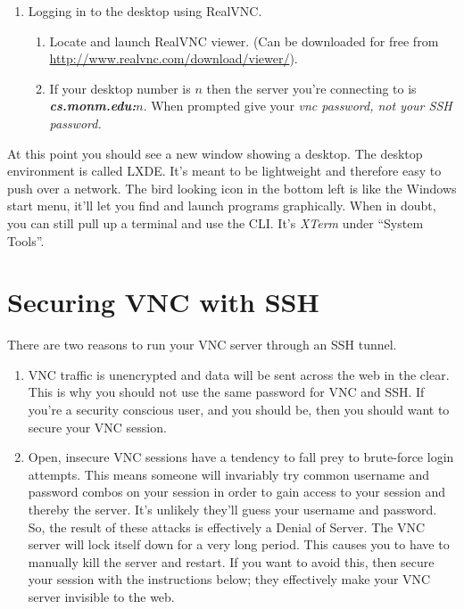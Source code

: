 \documentclass[10pt]{article}
\begin{document}
\begin{enumerate}
\item Logging in to the desktop using RealVNC.
\begin{enumerate}
\item Locate and launch RealVNC viewer. (Can be downloaded for free from \url{http://www.realvnc.com/download/viewer/}). 
\item If your desktop number is $n$ then the server you're connecting to is \textbf{\textit{cs.monm.edu:$n$}}. When prompted give your \textit{vnc password, not your SSH password.}
\end{enumerate}
\end{enumerate}
At this point you should see a new window showing a desktop.  The desktop environment is called LXDE. It's meant to be lightweight and therefore easy to push over a network.  The bird looking icon in the bottom left is like the Windows start menu, it'll let you find and launch programs graphically. When in doubt, you can still pull up a terminal and use the CLI. It's \textit{XTerm} under ``System Tools''.

\newpage
\section{Securing VNC with SSH}

There are two reasons to run your VNC server through an SSH tunnel. 
\begin{enumerate}
\item VNC traffic is unencrypted and data will be sent across the web in the clear. This is why you should not use the same password for VNC and SSH. If you're a security conscious user, and you should be, then you should want to secure your VNC session.
\item Open, insecure VNC sessions have a tendency to fall prey to brute-force login attempts. This means someone will invariably try common username and password combos on your session in order to gain access to your session and thereby the server. It's unlikely they'll guess your username and password. So, the result of these attacks is effectively a Denial of Server. The VNC server will lock itself down for a very long period. This causes you to have to manually kill the server and restart.  If you want to avoid this, then secure your session with the instructions below; they effectively make your VNC server invisible to the web. 
\end{enumerate}
\end{document}
